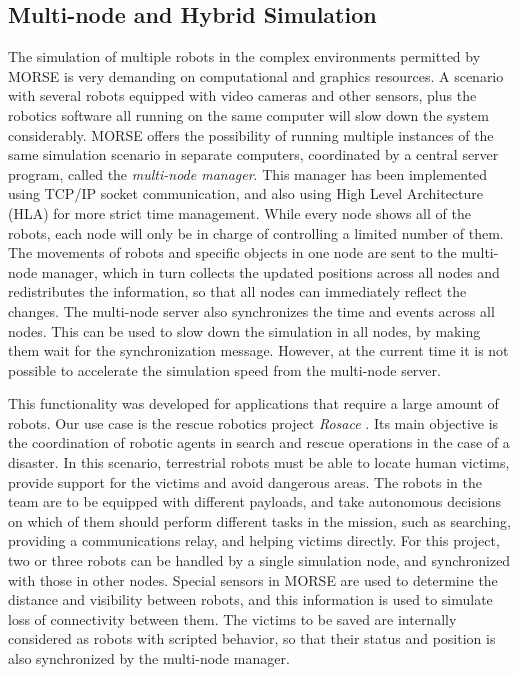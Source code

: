 \documentclass{llncs}
\newcommand{\serge}[1]{\nb{Serge}{blue}{#1}}
\newcommand{\gilberto}[1]{\nb{Gilberto}{red}{#1}}
\begin{document}
\subsection{Multi-node and Hybrid Simulation}
\label{section:multinode}

The simulation of multiple robots in the complex environments permitted by
MORSE is very demanding on computational and graphics resources.
A scenario with several robots equipped with video cameras and
other sensors, plus the robotics software all running on the same computer will
slow down the system considerably. MORSE offers the possibility of running
multiple instances of the same simulation scenario in separate computers,
coordinated by a central server program, called the \emph{multi-node
manager}. This manager has been implemented using TCP/IP socket communication,
and also using High Level Architecture (HLA) \cite{Kuhl:1999:CCS:318931} for
more strict time management.
While every node shows all of the robots, each node will only
be in charge of controlling a limited number of them. The movements
of robots and specific objects in one node are sent to the multi-node
manager, which in turn collects the updated positions across all nodes
and redistributes the information, so that all nodes can immediately
reflect the changes. The multi-node server also 
synchronizes the time and events across all nodes. This can be used
to slow down the simulation in all nodes, by making them wait for the
synchronization message. However, at the current time it is not possible to
accelerate the simulation speed from the multi-node server.

This functionality was developed for applications that require a large amount
of robots. Our use case is the rescue robotics project \emph{Rosace}
\cite{springerlink:10.1007/978-3-642-28786-2_32}.
Its main objective is the coordination of robotic agents in search and rescue
operations in the case of a disaster. In this scenario, terrestrial robots must
be able to locate human victims, provide support for the victims and avoid
dangerous areas. The robots in the team are to be equipped with different
payloads, and take autonomous decisions on which of them should perform
different tasks in the mission, such as searching, providing a communications
relay, and helping victims directly.
For this project, two or three robots can be handled by a single simulation
node, and synchronized with those in other nodes.  Special sensors in MORSE are
used to determine the distance and visibility between robots, and this
information is used to simulate loss of connectivity between them.
The victims to be saved are internally considered as robots with scripted
behavior, so that their status and position is also synchronized by the
multi-node manager.
\end{document}
